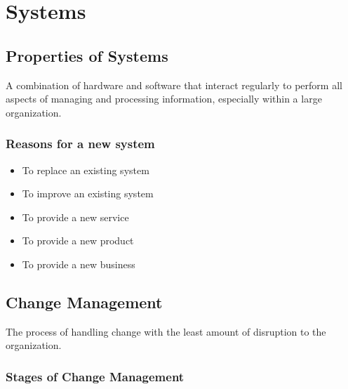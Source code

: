 \documentclass[12pt,fleqn]{book} %
\begin{document}

\pagestyle{fancy} %

\chapter{Systems}

\section{Properties of Systems}

\begin{definition}[System]
    A combination of hardware and software that interact regularly to perform 
    all aspects of managing and processing information, especially within a 
    large organization.
\end{definition}\par

\subsection{Reasons for a new system}
\begin{itemize}
  \item To replace an existing system
  \item To improve an existing system
  \item To provide a new service
  \item To provide a new product
  \item To provide a new business
\end{itemize}

\section{Change Management}
\begin{definition}
  The process of handling change with the least amount of disruption to the
  organization.
\end{definition}\par

\subsection{Stages of Change Management}
\end{document}
